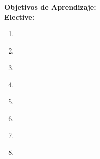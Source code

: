 \noindent \textbf{Objetivos de Aprendizaje:}\\
\noindent \textbf{Elective:}
\begin{enumerate}
	\setcounter{enumi}{0}
	\item \GVAdvancedRenderingLODemonstrateHowEstimates\xspace[\GVAdvancedRenderingLODemonstrateHowEstimatesLevel]\label{sec:BOK:GVAdvancedRenderingLODemonstrateHowEstimates}
	\item \GVAdvancedRenderingLOProveThe\xspace[\GVAdvancedRenderingLOProveTheLevel]\label{sec:BOK:GVAdvancedRenderingLOProveThe}
	\item \GVAdvancedRenderingLOAnalyzeThe\xspace[\GVAdvancedRenderingLOAnalyzeTheLevel]\label{sec:BOK:GVAdvancedRenderingLOAnalyzeThe}
	\item \GVAdvancedRenderingLOImplementAShading\xspace[\GVAdvancedRenderingLOImplementAShadingLevel]\label{sec:BOK:GVAdvancedRenderingLOImplementAShading}
	\item \GVAdvancedRenderingLODiscussHow\xspace[\GVAdvancedRenderingLODiscussHowLevel]\label{sec:BOK:GVAdvancedRenderingLODiscussHow}
	\item \GVAdvancedRenderingLOExplainHowThe\xspace[\GVAdvancedRenderingLOExplainHowTheLevel]\label{sec:BOK:GVAdvancedRenderingLOExplainHowThe}
	\item \GVAdvancedRenderingLOImplementAny\xspace[\GVAdvancedRenderingLOImplementAnyLevel]\label{sec:BOK:GVAdvancedRenderingLOImplementAny}
	\item \GVAdvancedRenderingLOImplementAFor\xspace[\GVAdvancedRenderingLOImplementAForLevel]\label{sec:BOK:GVAdvancedRenderingLOImplementAFor}
\end{enumerate}


